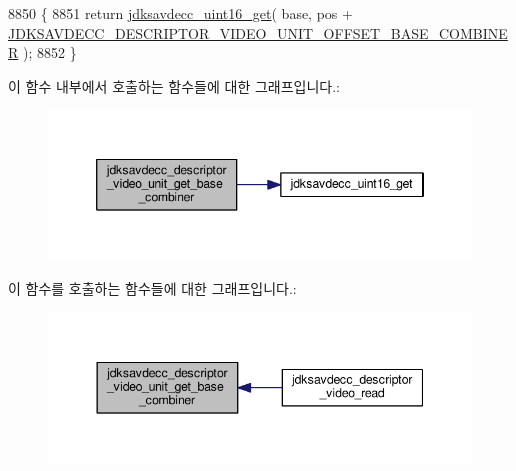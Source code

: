 \begin{DoxyCode}
8850 \{
8851     \textcolor{keywordflow}{return} \hyperlink{group__endian_ga3fbbbc20be954aa61e039872965b0dc9}{jdksavdecc\_uint16\_get}( base, pos + 
      \hyperlink{group__descriptor__video_ga13c3ef0d60bc8283d4092b202cd6f3dd}{JDKSAVDECC\_DESCRIPTOR\_VIDEO\_UNIT\_OFFSET\_BASE\_COMBINER} 
      );
8852 \}
\end{DoxyCode}


이 함수 내부에서 호출하는 함수들에 대한 그래프입니다.\+:
\nopagebreak
\begin{figure}[H]
\begin{center}
\leavevmode
\includegraphics[width=346pt]{group__descriptor__video_ga36b6feea8a4a307da0c5b4706597de06_cgraph}
\end{center}
\end{figure}




이 함수를 호출하는 함수들에 대한 그래프입니다.\+:
\nopagebreak
\begin{figure}[H]
\begin{center}
\leavevmode
\includegraphics[width=344pt]{group__descriptor__video_ga36b6feea8a4a307da0c5b4706597de06_icgraph}
\end{center}
\end{figure}


